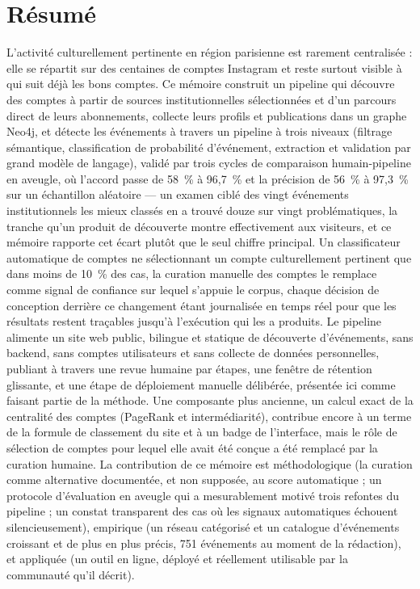 \documentclass[12pt, a4paper]{report}
\begin{document}
\section*{Résumé}
L'activité culturellement pertinente en région parisienne est rarement
centralisée : elle se répartit sur des centaines de comptes Instagram et
reste surtout visible à qui suit déjà les bons comptes. Ce mémoire
construit un pipeline qui découvre des comptes à partir de sources
institutionnelles sélectionnées et d'un parcours direct de leurs
abonnements, collecte leurs profils et publications dans un graphe
Neo4j, et détecte les événements à travers un pipeline à trois
niveaux (filtrage sémantique, classification de probabilité
d'événement, extraction et validation par grand modèle de langage),
validé par trois cycles de comparaison humain-pipeline en aveugle, où
l'accord passe de 58~\% à 96,7~\% et la précision de 56~\% à 97,3~\% sur
un échantillon aléatoire — un examen ciblé des vingt événements
institutionnels les mieux classés en a trouvé douze sur vingt
problématiques, la tranche qu'un produit de découverte montre
effectivement aux visiteurs, et ce mémoire rapporte cet écart plutôt que
le seul chiffre principal. Un classificateur automatique de comptes ne
sélectionnant un compte
culturellement pertinent que dans moins de 10~\% des cas, la curation
manuelle des comptes le remplace comme signal de confiance sur lequel
s'appuie le corpus, chaque décision de conception derrière ce
changement étant journalisée en temps réel pour que les résultats
restent traçables jusqu'à l'exécution qui les a produits. Le pipeline
alimente un site web public, bilingue et statique de découverte
d'événements, sans backend, sans comptes utilisateurs et sans collecte
de données personnelles, publiant à travers une revue humaine par
étapes, une fenêtre de rétention glissante, et une étape de déploiement
manuelle délibérée, présentée ici comme faisant partie de la méthode.
Une composante plus ancienne, un calcul exact de la centralité des
comptes (PageRank et intermédiarité), contribue encore à un terme de la
formule de classement du site et à un badge de l'interface, mais le
rôle de sélection de comptes pour lequel elle avait été conçue a été
remplacé par la curation humaine. La contribution de ce mémoire est
méthodologique (la curation comme alternative documentée, et non
supposée, au score automatique ; un protocole d'évaluation en aveugle
qui a mesurablement motivé trois refontes du pipeline ; un constat
transparent des cas où les signaux automatiques échouent
silencieusement), empirique (un réseau catégorisé et un catalogue
d'événements croissant et de plus en plus précis, 751 événements au
moment de la rédaction), et appliquée (un outil en ligne, déployé et
réellement utilisable par la communauté qu'il décrit).
\end{document}
